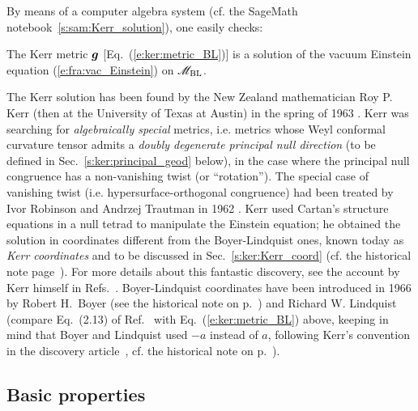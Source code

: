 By means of a computer algebra system (cf. the SageMath notebook~\ref{s:sam:Kerr_solution}),
one easily checks:
\begin{prop}
The Kerr metric $\bm{g}$ [Eq.~(\ref{e:ker:metric_BL})] is a solution of the vacuum
Einstein equation
(\ref{e:fra:vac_Einstein}) on $\mathscr{M}_{\rm BL}$.
\end{prop}

\begin{hist}
\label{h:ker:Kerr_sol}
The Kerr solution has been found by the New Zealand mathematician Roy P. Kerr (then at the University of Texas at Austin) in the spring of 1963
\cite{Kerr63}. Kerr was searching for \emph{algebraically special} metrics, i.e. metrics whose Weyl conformal curvature
tensor admits a \emph{doubly degenerate principal null direction} (to be defined
in Sec.~\ref{s:ker:principal_geod} below), in the case where the
principal null congruence has a non-vanishing twist (or ``rotation''). The special case of vanishing twist (i.e. hypersurface-orthogonal
congruence) had been treated by Ivor Robinson and
Andrzej Trautman in 1962 \cite{RobinT62}.
Kerr used
Cartan's structure equations in a null tetrad
to manipulate the Einstein equation; he obtained the solution in coordinates different from the Boyer-Lindquist ones, known today as \emph{Kerr coordinates} and
to be discussed in Sec.~\ref{s:ker:Kerr_coord} (cf. the historical note page~\pageref{h:ker:Kerr_coord}). For more details about this fantastic discovery, see the
account by Kerr himself in Refs.~\cite{Kerr09,KrasiVK09}.
Boyer-Lindquist coordinates have been introduced in 1966 by Robert H.~Boyer (see the historical note on p.~\pageref{h:sta:Boyer}) and Richard W. Lindquist \cite{BoyerL67} (compare Eq.~(2.13) of Ref.~\cite{BoyerL67} with
Eq.~(\ref{e:ker:metric_BL}) above, keeping in mind that Boyer and Lindquist used
$-a$ instead of $a$, following Kerr's convention in the discovery article~\cite{Kerr63}, cf.
the historical note on p.~\pageref{h:ker:Kerr_coord}).
\end{hist}

\subsection{Basic properties} \label{s:ker:basic_prop}

